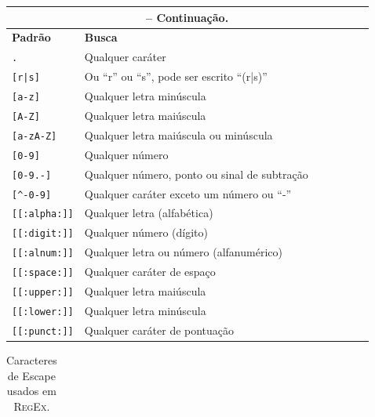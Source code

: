 \begin{refsection}
\begin{center}
\begin{longtable}{lllllll}
\multicolumn{6}{c}{{\bfseries \tablename\ \thetable{} -- Continuação.}}\\
\hline\hline \textbf{Padrão} & \textbf{Busca}\\
\endhead
\hline \hline
\endlastfoot
\texttt{.} & Qualquer caráter\\
\texttt{[r|s]} & Ou ``r'' ou ``s'', pode ser escrito ``(r|s)''\\
\texttt{[a-z]} & Qualquer letra minúscula\\
\texttt{[A-Z]} & Qualquer letra maiúscula\\
\texttt{[a-zA-Z]} & Qualquer letra maiúscula ou minúscula\\
\texttt{[0-9]}  &  Qualquer número\\
\texttt{[0-9.-]} & Qualquer número, ponto ou sinal de subtração\\
\texttt{[\^{}-0-9]} & Qualquer caráter exceto um número ou ``-''\\
\texttt{[[:alpha:]]} & Qualquer letra (alfabética)\\
\texttt{[[:digit:]]} & Qualquer número (dígito)\\
\texttt{[[:alnum:]]} & Qualquer letra ou número (alfanumérico)\\
\texttt{[[:space:]]} & Qualquer caráter de espaço\\
\texttt{[[:upper:]]} & Qualquer letra maiúscula\\
\texttt{[[:lower:]]} & Qualquer letra minúscula\\
\texttt{[[:punct:]]} & Qualquer caráter de pontuação\\

\end{longtable}
\end{center}



\pagestyle{fancy}
\begin{center}

\begin{longtable}{lllllll}
\caption[Tabela \ref{tut2:table:scape}:Caracteres de Escape usados em \textsc{RegEx}]{Caracteres de Escape usados em \textsc{RegEx}.} \label{tut2:table:scape} \\



\end{longtable}
\end{center}
\end{refsection}

